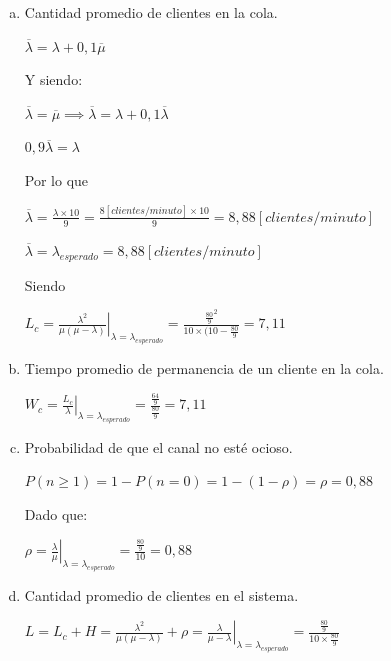 \documentclass[a4paper,11pt]{article}
\begin{document}
\vspace{13pt}
\begin{enumerate}[a)]
  \item Cantidad promedio de clientes en la cola.

    $\overline{\lambda} = \lambda + 0,1\overline{\mu}$

  Y siendo: 

  $\overline{\lambda} = \overline{\mu} \implies \overline{\lambda} = \lambda + 0,1\overline{\lambda}$

  $0,9\overline{\lambda} = \lambda$

  Por lo que  

  $\overline{\lambda} = \frac{\lambda \times 10}{9} = \frac{8[clientes/minuto] \times 10}{9} =  8,88[clientes/minuto]$

  $\overline{\lambda} = \lambda_{esperado} =  8,88[clientes/minuto]$

  Siendo 

  $L_c = \left.\frac{\lambda^2}{\mu(\mu-\lambda)}\right|_{\lambda=\lambda_{esperado}} = \frac{\frac{80}{9}^2}{10 \times (10-\frac{80}{9}} = 7,11$

  \vspace{13pt}
  \item Tiempo promedio de permanencia de un cliente en la cola.

    $W_c = \left.\frac{L_c}{\lambda}\right|_{\lambda=\lambda_{esperado}} = \frac{\frac{64}{9}}{\frac{80}{9}} = 7,11$

  \vspace{13pt}
  \item Probabilidad de que el canal no esté ocioso.

  $P(n \geq 1) = 1-P(n=0) = 1-(1-\rho) = \rho = 0,88$

  Dado que:

  $\rho = \left.\frac{\lambda}{\mu}\right|_{\lambda=\lambda_{esperado}} = \frac{\frac{80}{9}}{10} = 0,88$

  \vspace{13pt}
  \item Cantidad promedio de clientes en el sistema.\label{h.8dp3y8yzivhk}

    $L = L_c + H = \frac{\lambda^2}{\mu(\mu-\lambda)} + \rho = \left.\frac{\lambda}{\mu-\lambda}\right|_{\lambda=\lambda_{esperado}} = \frac{\frac{80}{9}}{10 \times \frac{80}{9}}$

\end{enumerate}

\vspace{35pt}
\leftskip=0pt
\parindent=0pt
\end{document}
